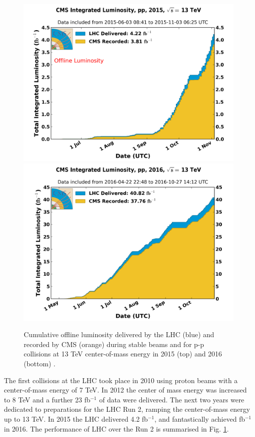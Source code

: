 \begin{figure}[p]
\centering
\includegraphics[scale=0.6]{figures/experiment/int_lumi_per_day_cumulative_pp_2015.png}\\\vspace{1cm}
\includegraphics[scale=0.6]{figures/experiment/int_lumi_per_day_cumulative_pp_2016.png}
\caption[Performance of LHC over the Run 2]{Cumulative offline luminosity delivered by the LHC (blue) and recorded by CMS (orange) during stable beams and for p-p collisions at 13 TeV center-of-mass energy in 2015 (top) and 2016 (bottom) \cite{lumiPOG}.
} 
\label{lumiplot}
\end{figure}

The first collisions at the LHC took place in 2010 using proton beams with a center-of-mass energy of 7 TeV. In 2012 the center of mass energy was increased to 8 TeV and a further 23 fb$^{-1}$ of data were delivered. The next two years were dedicated to preparations for the LHC Run 2, ramping the center-of-mass energy up to 13 TeV. In 2015 the LHC delivered 4.2 fb$^{-1}$, and fantastically achieved  fb$^{-1}$ in 2016. The performance of LHC over the Run 2 is summarised in Fig. \ref{lumiplot}.

